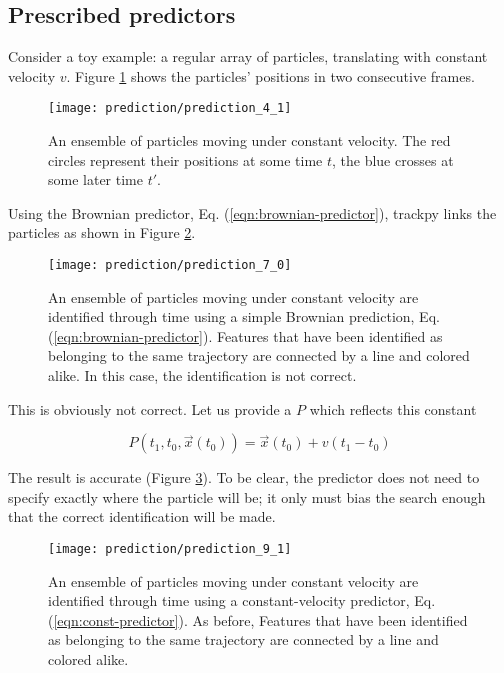 \subsection{Prescribed predictors}\label{prescribed-predictors}

Consider a toy example: a regular array of particles,
translating with constant velocity $v$. Figure \ref{fig:prediction-const-features}
shows the particles' positions in two consecutive frames.

    \begin{figure}
    \centering
    \texttt{[image: prediction/prediction\_4\_1]}
    \caption{\label{fig:prediction-const-features}An ensemble of particles moving under constant velocity. The red circles represent their positions at some time $t$, the blue crosses at some later time $t'$.}
    \end{figure}

\noindent Using the Brownian predictor, Eq. (\ref{eqn:brownian-predictor}), trackpy links the particles as shown in Figure \ref{fig:prediction-const-brownian-link}.

   \begin{figure}
    \centering
    \texttt{[image: prediction/prediction\_7\_0]}
    \caption{\label{fig:prediction-const-brownian-link}An ensemble of particles moving under constant velocity are identified through time using a simple Brownian prediction, Eq. (\ref{eqn:brownian-predictor}). Features that have been identified as belonging to the same trajectory are connected by a line and colored alike. In this case, the identification is not correct.}
    \end{figure}
    
\noindent This is obviously not correct. Let us provide a $P$ which reflects this constant

\begin{equation}
\label{eqn:const-predictor}
P(t_1, t_0, \vec x(t_0)) = \vec x(t_0) + v(t_1 - t_0)
\end{equation}

\noindent The result is accurate (Figure \ref{fig:prediction-const-const-link}). To be clear, the predictor does not need to specify exactly where the
particle will be; it only must bias the search enough that the correct
identification will be made.

   \begin{figure}
    \centering
    \texttt{[image: prediction/prediction\_9\_1]}
    \caption{\label{fig:prediction-const-const-link}An ensemble of particles moving under constant velocity are identified through time using a constant-velocity predictor, Eq. (\ref{eqn:const-predictor}). As before, Features that have been identified as belonging to the same trajectory are connected by a line and colored alike. }
    \end{figure}

